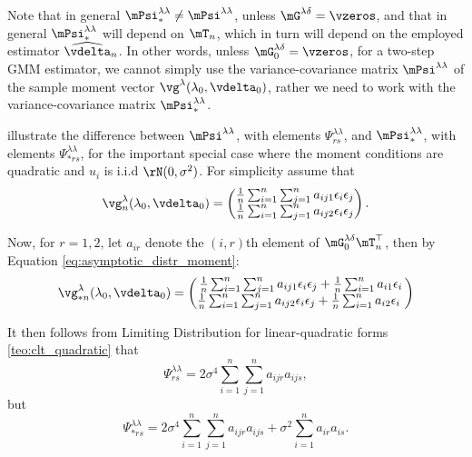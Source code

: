 \documentclass[english,12pt]{book}\usepackage[]{graphicx}\usepackage[]{xcolor}
\begin{document}
Note that in general $\mPsi_{*}^{\lambda\lambda}\neq \mPsi^{\lambda\lambda}$, unless $\mG^{\lambda\delta} = \vzeros$, and that in general $\mPsi_{*}^{\lambda\lambda}$ will depend on $\mT_n$, which in turn will depend on the employed estimator $\widehat{\vdelta}_n$. In other words, unless $\mG^{\lambda\delta}_0 = \vzeros$, for a two-step GMM estimator, we cannot simply use the variance-covariance matrix $\mPsi^{\lambda\lambda}$ of the sample moment vector $\vg^{\lambda}(\lambda_0, \vdelta_0)$, rather we need to work with the variance-covariance matrix $\mPsi_{*}^{\lambda\lambda}$.

\cite{pruchaHB} illustrate the difference between $\mPsi^{\lambda\lambda}$, with elements $\Psi_{rs}^{\lambda\lambda}$, and $\mPsi_{*}^{\lambda\lambda}$, with elements $\Psi_{*rs}^{\lambda\lambda}$, for the important special case where the moment conditions are quadratic and $u_i$ is i.i.d $\rN(0, \sigma^2)$. For simplicity assume that
\begin{equation*}
\vg_n^{\lambda}(\lambda_0, \vdelta_0) = \begin{pmatrix}
\frac{1}{n}\sum_{i = 1} ^n\sum_{j = 1} ^na_{ij1}\epsilon_i \epsilon_j \\
\frac{1}{n}\sum_{i = 1} ^n\sum_{j = 1} ^na_{ij2} \epsilon_i \epsilon_j
\end{pmatrix}.
\end{equation*}

Now, for $r = 1,2$, let $a_{ir}$ denote the $(i,r)$th element of $\mG^{\lambda\delta}_0\mT_n^\top$, then by Equation \eqref{eq:asymptotic_distr_moment}:
\begin{equation*}
\vg_{*n}^{\lambda}(\lambda_0, \vdelta_0) = \begin{pmatrix}
\frac{1}{n}\sum_{i = 1} ^n\sum_{j = 1} ^na_{ij1}\epsilon_i \epsilon_j + \frac{1}{n}\sum_{i=1}^na_{i1}\epsilon_i\\
\frac{1}{n}\sum_{i = 1} ^n\sum_{j = 1} ^na_{ij2}\epsilon_i \epsilon_j + \frac{1}{n}\sum_{i=1}^na_{i2}\epsilon_i\
\end{pmatrix}
\end{equation*}

It then follows from Limiting Distribution for linear-quadratic forms \ref{teo:clt_quadratic} that
\begin{equation*}
\Psi_{rs}^{\lambda\lambda} = 2\sigma^4\sum_{i = 1} ^n \sum_{j = 1}^n a_{ijr}a_{ijs}, 
\end{equation*}
%
but
\begin{equation*}
\Psi_{*rs}^{\lambda\lambda} = 2\sigma^4\sum_{i = 1} ^n \sum_{j = 1} ^n a_{ijr}a_{ijs} + \sigma^2\sum_{i=1}^n a_{ir}a_{is}.
\end{equation*}
\end{document}
